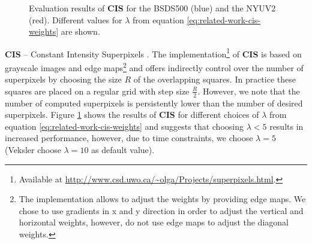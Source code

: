 \begin{figure}[b]
{
	}
	\caption[Evaluation results of \textbf{CIS} \cite{VekslerBoykovMehrani:2010} obtained on the validation set of the Berkeley Segmentation Dataset \cite{ArbelaezMaireFowlkesMalik:2011} and the training set of the NYU Depth Dataset \cite{SilbermanHoiemKohliFergus:2012}.]{Evaluation results of \textbf{CIS} for the BSDS500 (blue) and the NYUV2 (red). Different values for $\lambda$ from equation \eqref{eq:related-work-cis-weights} are shown.}
	\label{fig:evaluation-cis}
\end{figure}
\textbf{CIS} -- Constant Intensity Superpixels \cite{VekslerBoykovMehrani:2010}. The implementation\footnote{Available at \url{http://www.csd.uwo.ca/~olga/Projects/superpixels.html}.} of \textbf{CIS} is based on grayscale images and edge maps\footnote{The implementation allows to adjust the weights by providing edge maps. We chose to use gradients in x and y direction in order to adjust the vertical and horizontal weights, however, do not use edge maps to adjust the diagonal weights.} and offers indirectly control over the number of superpixels by choosing the size $R$ of the overlapping squares. In practice these squares are placed on a regular grid with step size $\frac{R}{2}$. However, we note that the number of computed superpixels is persistently lower than the number of desired superpixels. Figure \ref{fig:evaluation-cis} shows the results of \textbf{CIS} for different choices of $\lambda$ from equation \eqref{eq:related-work-cis-weights} and suggests that choosing $\lambda < 5$ results in increased performance, however, due to time constraints, we choose $\lambda = 5$ (Veksler \etal choose $\lambda = 10$ as default value). %

